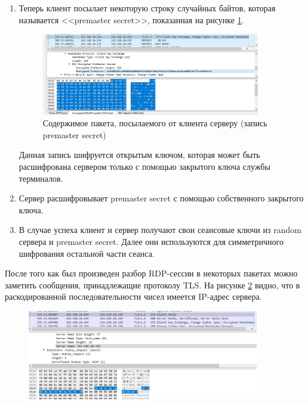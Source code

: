 \documentclass[bachelor, och, coursework]{SCWorks}
\begin{document}
\begin{enumerate}
    \item Теперь клиент посылает некоторую строку случайных байтов, которая называется <<premaster secret>>, показанная на рисунке \ref{cert1}. 
    
    \begin{figure}[H]
      \centering
      \includegraphics[width=0.9\textwidth]{photo/cert1.png}
      \caption{Содержимое пакета, посылаемого от клиента серверу (запись premaster secret)}
      \label{cert1}
    \end{figure}
    
    Данная запись шифруется открытым ключом, которая может быть расшифрована сервером только с помощью закрытого ключа службы терминалов.
    \item Сервер расшифровывает premaster secret с помощью собственного закрытого ключа.
    \item В случае успеха клиент и сервер получают свои сеансовые ключи из random сервера и premaster secret. Далее они используются для симметричного 
    шифрования остальной части сеанса.
  \end{enumerate}

  После того как был произведен разбор RDP-сессии в некоторых пакетах можно заметить сообщения, принадлежащие протоколу TLS.
  На рисунке \ref{clnt-hello} видно, что в раскодированной последовательности чисел имеется IP-адрес сервера.

  \begin{figure}[H]
    \centering
    \includegraphics[width=0.9\textwidth]{photo/clnt-hello.jpg}
    \caption{}
    \label{clnt-hello}
  \end{figure}  
\end{document}
